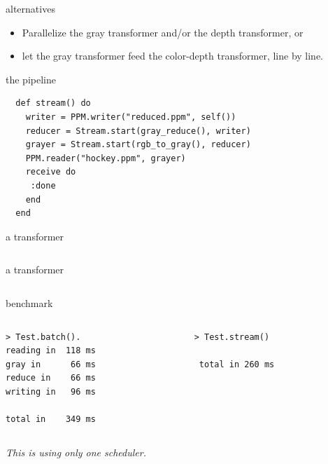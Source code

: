 \begin{frame}{alternatives}

\begin{itemize}
\pause \item Parallelize the gray transformer and/or the depth transformer, or
\pause \item let the gray transformer feed the color-depth transformer, line by line.
\end{itemize}

\pause\vspace{10pt}{\em A pipe-line: reader - transform - transform - writer}

\end{frame}

\begin{frame}[fragile]{the pipeline}

\begin{verbatim}
  def stream() do
    writer = PPM.writer("reduced.ppm", self())
    reducer = Stream.start(gray_reduce(), writer)     
    grayer = Stream.start(rgb_to_gray(), reducer)     
    PPM.reader("hockey.ppm", grayer)
    receive do
     :done
    end
  end
\end{verbatim}

\end{frame}

\begin{frame}[fragile]{a transformer}
\begin{verbatim}

\end{verbatim}
\end{frame}


\begin{frame}[fragile]{a transformer}
\begin{verbatim}

\end{verbatim}
\end{frame}

\begin{frame}[fragile]{benchmark}

\begin{columns}
 \begin{column}{0.5\linewidth}
\begin{verbatim}
> Test.batch().
reading in  118 ms 
gray in      66 ms 
reduce in    66 ms 
writing in   96 ms 

total in    349 ms
\end{verbatim}
 \end{column}
\pause
 \begin{column}{0.5\linewidth}
\begin{verbatim}
> Test.stream()

 total in 260 ms 
\end{verbatim}
 \end{column}
\end{columns}

\pause\vspace{10pt}
{\em This is using only one scheduler.}

\end{frame}

